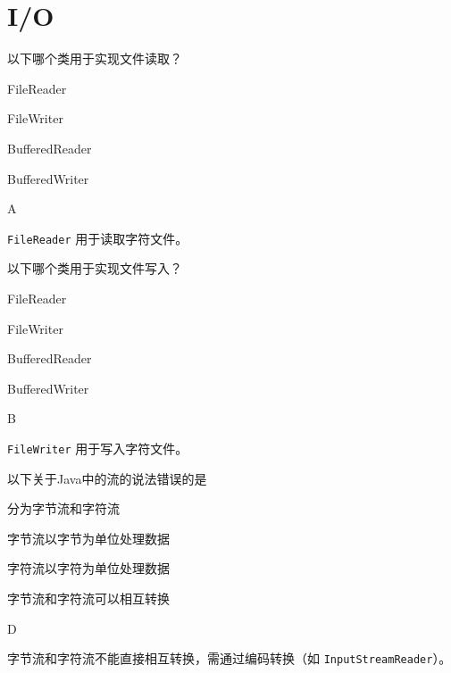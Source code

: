 \section{I/O}

\begin{question}
	以下哪个类用于实现文件读取？
	\begin{options}
		\item FileReader
		\item FileWriter
		\item BufferedReader
		\item BufferedWriter
	\end{options}
	\begin{answer}
		A
	\end{answer}
	\begin{explanation}
		\texttt{FileReader} 用于读取字符文件。
	\end{explanation}
\end{question}

\begin{question}
	以下哪个类用于实现文件写入？
	\begin{options}
		\item FileReader
		\item FileWriter
		\item BufferedReader
		\item BufferedWriter
	\end{options}
	\begin{answer}
		B
	\end{answer}
	\begin{explanation}
		\texttt{FileWriter} 用于写入字符文件。
	\end{explanation}
\end{question}

\begin{question}
	以下关于Java中的流的说法错误的是
	\begin{options}
		\item 分为字节流和字符流
		\item 字节流以字节为单位处理数据
		\item 字符流以字符为单位处理数据
		\item 字节流和字符流可以相互转换
	\end{options}
	\begin{answer}
		D
	\end{answer}
	\begin{explanation}
		字节流和字符流不能直接相互转换，需通过编码转换（如 \texttt{InputStreamReader}）。
	\end{explanation}
\end{question}


